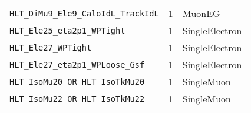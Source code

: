 \begin{table}[h]
\begin{tabular}{lcl}
            \texttt{HLT\_DiMu9\_Ele9\_CaloIdL\_TrackIdL} &  1 &   MuonEG \\
            \texttt{HLT\_Ele25\_eta2p1\_WPTight} &     1 &   SingleElectron \\
            \texttt{HLT\_Ele27\_WPTight} &    1 &   SingleElectron \\
            \texttt{HLT\_Ele27\_eta2p1\_WPLoose\_Gsf} &     1 &   SingleElectron \\
            \texttt{HLT\_IsoMu20 OR HLT\_IsoTkMu20} &    1 &   SingleMuon \\
            \texttt{HLT\_IsoMu22 OR HLT\_IsoTkMu22} &    1 &   SingleMuon \\
        \hline
		\end{tabular}
	\label{table:dilep_2016_trig}
\end{table}
